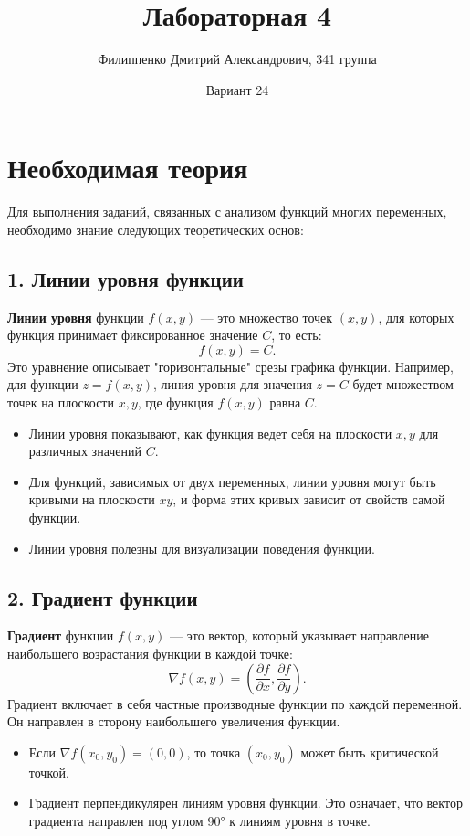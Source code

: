 \documentclass[a4paper,12pt]{article}
\title{Лабораторная 4}
\author{Филиппенко Дмитрий Александрович, 341 группа}
\date{Вариант 24}
\begin{document}
\maketitle

\section*{Необходимая теория}

Для выполнения заданий, связанных с анализом функций многих переменных, необходимо знание следующих теоретических основ:

\subsection*{1. Линии уровня функции}

\textbf{Линии уровня} функции \( f(x, y) \) — это множество точек \( (x, y) \), для которых функция принимает фиксированное значение \( C \), то есть:
\[
f(x, y) = C.
\]
Это уравнение описывает "горизонтальные" срезы графика функции. Например, для функции \( z = f(x, y) \), линия уровня для значения \( z = C \) будет множеством точек на плоскости \( x, y \), где функция \( f(x, y) \) равна \( C \).

\begin{itemize}
    \item Линии уровня показывают, как функция ведет себя на плоскости \( x, y \) для различных значений \( C \).
    \item Для функций, зависимых от двух переменных, линии уровня могут быть кривыми на плоскости \( xy \), и форма этих кривых зависит от свойств самой функции.
    \item Линии уровня полезны для визуализации поведения функции.
\end{itemize}

\subsection*{2. Градиент функции}

\textbf{Градиент} функции \( f(x, y) \) — это вектор, который указывает направление наибольшего возрастания функции в каждой точке:
\[
\nabla f(x, y) = \left( \frac{\partial f}{\partial x}, \frac{\partial f}{\partial y} \right).
\]
Градиент включает в себя частные производные функции по каждой переменной. Он направлен в сторону наибольшего увеличения функции.

\begin{itemize}
    \item Если \( \nabla f(x_0, y_0) = (0, 0) \), то точка \( (x_0, y_0) \) может быть критической точкой.
    \item Градиент перпендикулярен линиям уровня функции. Это означает, что вектор градиента направлен под углом 90° к линиям уровня в точке.
\end{itemize}
\end{document}
